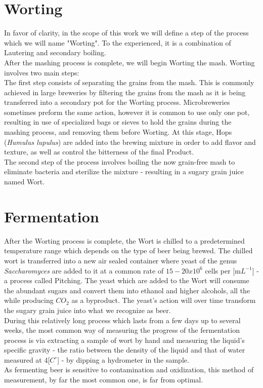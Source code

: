 \documentclass[twoside]{ctuthesis}
\theoremstyle{plain}
\theoremstyle{definition}
\theoremstyle{note}
\begin{document}
\section{Worting}
In favor of clarity, in the scope of this work we will define a step of the process which we will name "Worting". To the experienced, it is a combination of Lautering and secondary boiling.\\
After the mashing process is complete, we will begin Worting the mash. Worting involves two main steps:\\
The first step consists of separating the grains from the mash. This is commonly achieved in large breweries by filtering the grains from the mash as it is being transferred into a secondary pot for the Worting process. Microbreweries sometimes preform the same action, however it is common to use only one pot, resulting in use of specialized bags or sieves to hold the grains during the mashing process, and removing them before Worting. At this stage, Hops (\textit{Humulus lupulus}) are added into the brewing mixture in order to add flavor and texture, as well as control the bitterness of the final Product.\cite{Hops}\\
The second step of the process involves boiling the now grain-free mash to eliminate bacteria and sterilize the mixture - resulting in a sugary grain juice named Wort.

\section{Fermentation} 
After the Worting process is complete, the Wort is chilled to a predetermined temperature range which depends on the type of beer being brewed. The chilled wort is transferred into a new air sealed container where yeast of the genus \textit{Saccharomyces} are added to it at a common rate of $15-20 x 10^6$ cells per [m$L^{-1}$] - a process called Pitching. The yeast which are added to the Wort will consume the abundant sugars and convert them into ethanol and higher alcohols, all the while producing $CO_2$ as a byproduct. The yeast's action will over time transform the sugary grain juice into what we recognize as beer.\\
During this relatively long process which lasts from a few days up to several weeks, the most common way of measuring the progress of the fermentation process is via extracting a sample of wort by hand and measuring the liquid's specific gravity - the ratio between the density of the liquid and that of water measured at 4[$C^\circ$] - by dipping a hydrometer in the sample.\\
As fermenting beer is sensitive to contamination and oxidization, this method of measurement, by far the most common one, is far from optimal. \cite{Biochemistry}
\end{document}
